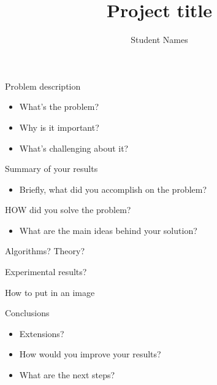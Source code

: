 \documentclass[xcolor=svgnames]{beamer}
\title{Project title}
\author{Student Names}
\begin{document}
\begin{frame}[plain]
  \titlepage
\end{frame}

\begin{frame}{Problem description}
    \begin{itemize}
    	\item What's the problem?
    	\item Why is it important?
    	\item What's challenging about it?
    \end{itemize}
\end{frame}

\begin{frame}{Summary of your results}
	\begin{itemize}
		\item Briefly, what did you accomplish on the problem?
	\end{itemize}
\end{frame}

\begin{frame}{HOW did you solve the problem?}
	\begin{itemize}
		\item What are the main ideas behind your solution?
	\end{itemize}
\end{frame}

\begin{frame}{Algorithms? Theory?}
	
\end{frame}

\begin{frame}{Experimental results?}
	
\end{frame}

\begin{frame}{How to put in an image}
\end{frame}

\begin{frame}{Conclusions}
	\begin{itemize}
		\item Extensions?
		\item How would you improve your results?
		\item What are the next steps?
	\end{itemize}
\end{frame}
\end{document}
